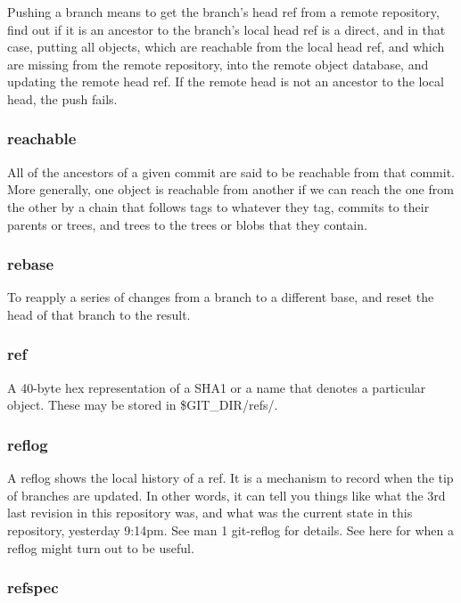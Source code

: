 Pushing a branch means to get the branch's head ref from a remote repository, find out if it is an ancestor to the branch's local head ref is a direct, and in that case, putting all objects, which are reachable from the local head ref, and which are missing from the remote repository, into the remote object database, and updating the remote head ref. If the remote head is not an ancestor to the local head, the push fails.

\subsubsection{reachable}

All of the ancestors of a given commit are said to be reachable from that commit. More generally, one object is reachable from another if we can reach the one from the other by a chain that follows tags to whatever they tag, commits to their parents or trees, and trees to the trees or blobs that they contain.

\subsubsection{rebase}

To reapply a series of changes from a branch to a different base, and reset the head of that branch to the result.

\subsubsection{ref}

A 40-byte hex representation of a SHA1 or a name that denotes a particular object. These may be stored in \$GIT\_DIR/refs/.

\subsubsection{reflog}

A reflog shows the local history of a ref. It is a mechanism to record when the tip of branches are updated. In other words, it can tell you things like what the 3rd last revision in this repository was, and what was the current state in this repository, yesterday 9:14pm. See man 1 git-reflog for details. See here for when a reflog might turn out to be useful.

\subsubsection{refspec}

